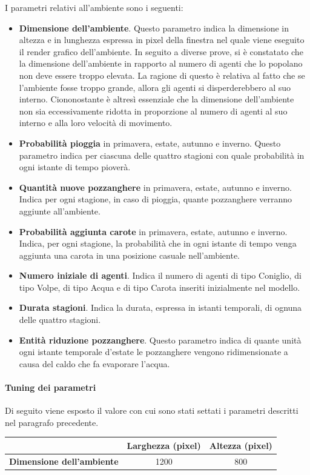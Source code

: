 \documentclass[11pt]{article}
\begin{document}
I parametri relativi all'ambiente sono i seguenti: 
\begin{itemize}
    \item \textbf{Dimensione dell'ambiente}. Questo parametro indica la dimensione in altezza e in lunghezza espressa in pixel della finestra nel quale viene eseguito il render grafico dell'ambiente. In seguito a diverse prove, si è constatato che la dimensione dell'ambiente in rapporto al numero di agenti che lo popolano non deve essere troppo elevata. La ragione di questo è relativa al fatto che se l'ambiente fosse troppo grande, allora gli agenti si disperderebbero al suo interno. Ciononostante è altresì essenziale che la dimensione dell'ambiente non sia eccessivamente ridotta in proporzione al numero di agenti al suo interno e alla loro velocità di movimento. 
    \item \textbf{Probabilità pioggia} in primavera, estate, autunno e inverno. Questo parametro indica per ciascuna delle quattro stagioni con quale probabilità in ogni istante di tempo pioverà.
    \item \textbf{Quantità nuove pozzanghere} in primavera, estate, autunno e inverno. Indica per ogni stagione, in caso di pioggia, quante pozzanghere verranno aggiunte all'ambiente. 
    \item \textbf{Probabilità aggiunta carote} in primavera, estate, autunno e inverno. Indica, per ogni stagione, la probabilità che in ogni istante di tempo venga aggiunta una carota in una posizione casuale nell'ambiente. 
    \item \textbf{Numero iniziale di agenti}. Indica il numero di agenti di tipo Coniglio, di tipo Volpe, di tipo Acqua e di tipo Carota inseriti inizialmente nel modello. 
    \item \textbf{Durata stagioni}. Indica la durata, espressa in istanti temporali, di ognuna delle quattro stagioni. 
    \item \textbf{Entità riduzione pozzanghere}. Questo parametro indica di quante unità ogni istante temporale d'estate le pozzanghere vengono ridimensionate a causa del caldo che fa evaporare l'acqua. 
\end{itemize}
\vspace{2pt}
\paragraph{Tuning dei parametri}
\label{sec:tuningAmbiente}
Di seguito viene esposto il valore con cui sono stati settati i parametri descritti nel paragrafo precedente.
\vspace{13pt}
\begin{table}[h!]
\centering
{\renewcommand\arraystretch{1.6}
\begin{tabular}{l|cc}
 & \textbf{Larghezza (pixel)} & \textbf{Altezza (pixel)} \\ \hline
\textbf{Dimensione dell'ambiente} & 1200      & 800      
\end{tabular}}
\end{table}
\end{document}
